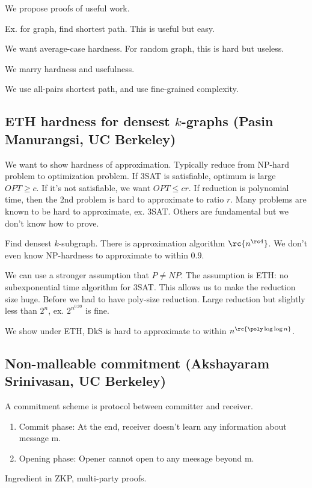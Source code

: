 We propose proofs of useful work.

Ex. for graph, find shortest path. This is useful but easy.

We want average-case hardness. For random graph, this is hard but useless.

We marry hardness and usefulness.

We use all-pairs shortest path, and use fine-grained complexity.

\subsection{ETH hardness for densest $k$-graphs (Pasin Manurangsi, UC Berkeley)}

We want to show hardness of approximation. Typically reduce from NP-hard problem to optimization problem. If 3SAT is satisfiable, optimum is large $OPT\ge c$. If it's not satisfiable, we want $OPT\le cr$. If reduction is polynomial time, then the 2nd problem is hard to approximate to ratio $r$. Many problems are known to be hard to approximate, ex. 3SAT. Others are fundamental but we don't know how to prove.

Find densest $k$-subgraph. There is approximation algorithm $\rc{n^{\rc 4}}$. 
We don't even know NP-hardness to approximate to within $0.9$. 

We can use a stronger assumption that $P\ne NP$. The assumption is ETH: no subexponential time algorithm for 3SAT. This allows us to make the reduction size huge.
Before we had to have poly-size reduction. Large reduction but slightly less than $2^n$, ex. $2^{n^{0.99}}$ is fine. 

We show under ETH, DkS is hard to approximate to within $n^{\rc{\poly\log\log n}}$.

\subsection{Non-malleable commitment (Akshayaram Srinivasan, UC Berkeley)}

A commitment scheme is protocol between committer and receiver. 
\begin{enumerate}
\item
Commit phase: At the end, receiver doesn't learn any information about message m.
\item
Opening phase: Opener cannot open to any meesage beyond m.
\end{enumerate}
Ingredient in ZKP, multi-party proofs.


